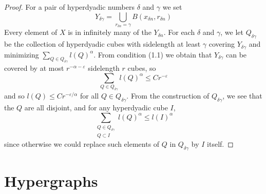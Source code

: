 \begin{proof}
    For a pair of hyperdyadic numbers $\delta$ and $\gamma$ we set
    \[ Y_{\delta \gamma} = \bigcup_{r_{\delta n} = \gamma} B(x_{\delta n}, r_{\delta n}) \]
    Every element of $X$ is in infinitely many of the $Y_{\delta n}$. For each $\delta$ and $\gamma$, we let $Q_{\delta \gamma}$ be the collection of hyperdyadic cubes with sidelength at least $\gamma$ covering $Y_{\delta \gamma}$ and minimizing $\sum_{Q \in Q_{\delta \gamma}} l(Q)^\alpha$. From condition (1.1) we obtain that $Y_{\delta \gamma}$ can be covered by at most $r^{-\alpha - \varepsilon}$ sidelength $r$ cubes, so
    \[ \sum_{Q \in Q_{\delta \gamma}} l(Q)^\alpha \leq Cr^{-\varepsilon} \]
    and so $l(Q) \leq Cr^{-\varepsilon/\alpha}$ for all $Q \in Q_{\delta \gamma}$. From the construction of $Q_{\delta \gamma}$, we see that the $Q$ are all disjoint, and for any hyperdyadic cube $I$,
    \[ \sum_{\substack{Q \in Q_{\delta \gamma}\\Q \subset I}} l(Q)^\alpha \leq l(I)^\alpha \]
    since otherwise we could replace such elements of $Q$ in $Q_{\delta \gamma}$ by $I$ itself.
\end{proof}










\section{Hypergraphs}

